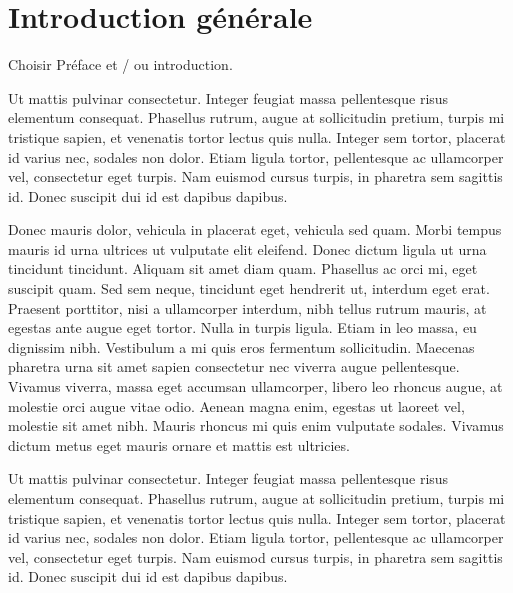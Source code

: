 \documentclass{FramateX}
\begin{document}
%
\cleardoublepage

\chapter*{Introduction générale}
{}
%

                    

Choisir Préface et / ou introduction.

Ut mattis pulvinar consectetur. Integer feugiat massa pellentesque risus elementum consequat. Phasellus rutrum, augue at sollicitudin pretium, turpis mi tristique sapien, et venenatis tortor lectus quis nulla. Integer sem tortor, placerat id varius nec, sodales non dolor. Etiam ligula tortor, pellentesque ac ullamcorper vel, consectetur eget turpis. Nam euismod cursus turpis, in pharetra sem sagittis id. Donec suscipit dui id est dapibus dapibus.

Donec mauris dolor, vehicula in placerat eget, vehicula sed quam. Morbi tempus mauris id urna ultrices ut vulputate elit eleifend. Donec dictum ligula ut urna tincidunt tincidunt. Aliquam sit amet diam quam. Phasellus ac orci mi, eget suscipit quam. Sed sem neque, tincidunt eget hendrerit ut, interdum eget erat. Praesent porttitor, nisi a ullamcorper interdum, nibh tellus rutrum mauris, at egestas ante augue eget tortor. Nulla in turpis ligula. Etiam in leo massa, eu dignissim nibh. Vestibulum a mi quis eros fermentum sollicitudin. Maecenas pharetra urna sit amet sapien consectetur nec viverra augue pellentesque. Vivamus viverra, massa eget accumsan ullamcorper, libero leo rhoncus augue, at molestie orci augue vitae odio. Aenean magna enim, egestas ut laoreet vel, molestie sit amet nibh. Mauris rhoncus mi quis enim vulputate sodales. Vivamus dictum metus eget mauris ornare et mattis est ultricies.

Ut mattis pulvinar consectetur. Integer feugiat massa pellentesque risus elementum consequat. Phasellus rutrum, augue at sollicitudin pretium, turpis mi tristique sapien, et venenatis tortor lectus quis nulla. Integer sem tortor, placerat id varius nec, sodales non dolor. Etiam ligula tortor, pellentesque ac ullamcorper vel, consectetur eget turpis. Nam euismod cursus turpis, in pharetra sem sagittis id. Donec suscipit dui id est dapibus dapibus.
\end{document}
